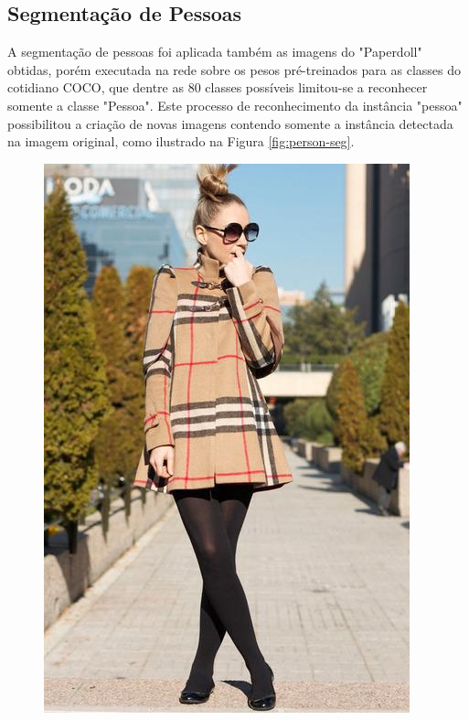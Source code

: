 \documentclass[12pt]{report}
\begin{document}
\subsection{Segmentação de Pessoas}

A segmentação de pessoas foi aplicada também as imagens do "Paperdoll" obtidas, porém executada na rede sobre os pesos pré-treinados para as classes do cotidiano COCO, que dentre as 80 classes possíveis limitou-se a reconhecer somente a classe "Pessoa". Este processo de reconhecimento da instância "pessoa" possibilitou a criação de novas imagens contendo somente a instância detectada na imagem original, como ilustrado na Figura \ref{fig:person-seg}. 

\begin{figure}
  \centering
  \begin{minipage}[b]{0.3\textwidth}
    \includegraphics[width=\textwidth]{images/resultados/299206original.jpg}

\end{minipage}
\end{figure}
\end{document}
